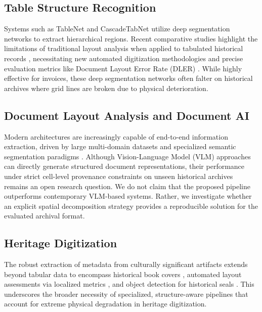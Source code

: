 \documentclass[pdflatex,sn-mathphys-num]{sn-jnl}
\begin{document}
\subsection{Table Structure Recognition}
Systems such as TableNet \cite{paliwal2019tablenet} and CascadeTabNet utilize deep segmentation networks to extract hierarchical regions. Recent comparative studies highlight the limitations of traditional layout analysis when applied to tabulated historical records \cite{Liang2021}, necessitating new automated digitization methodologies \cite{Mertova2025} and precise evaluation metrics like Document Layout Error Rate (DLER) \cite{Vesalainen2024}. While highly effective for invoices, these deep segmentation networks often falter on historical archives where grid lines are broken due to physical deterioration. 

\subsection{Document Layout Analysis and Document AI}
Modern architectures are increasingly capable of end-to-end information extraction, driven by large multi-domain datasets \cite{Shihab2023326} and specialized semantic segmentation paradigms \cite{Atamni2026376}. Although Vision-Language Model (VLM) approaches can directly generate structured document representations, their performance under strict cell-level provenance constraints on unseen historical archives remains an open research question. We do not claim that the proposed pipeline outperforms contemporary VLM-based systems. Rather, we investigate whether an explicit spatial decomposition strategy provides a reproducible solution for the evaluated archival format.

\subsection{Heritage Digitization}
The robust extraction of metadata from culturally significant artifacts extends beyond tabular data to encompass historical book covers \cite{Aljuhaymi2026320}, automated layout assessments via localized metrics \cite{Tomasovic2025}, and object detection for historical seals \cite{Chanda2020821}. This underscores the broader necessity of specialized, structure-aware pipelines that account for extreme physical degradation in heritage digitization.

\end{document}
